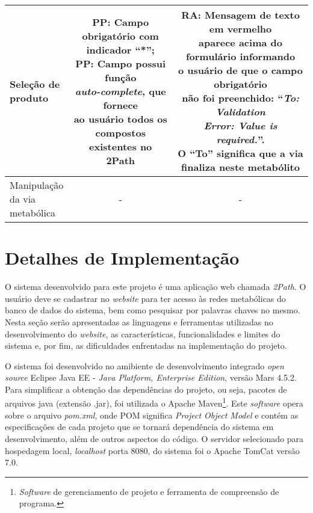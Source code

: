 \begin{table}
\begin{tabular}{|l|c|c|}
\specialcell{Seleção de\\produto} & \specialcell{\textbf{PP}: Campo obrigatório com\\indicador ``*'';\\\textbf{PP}: Campo possui função\\\textit{auto-complete}, que fornece\\ao usuário todos os\\compostos existentes no\\2Path} & \specialcell{\textbf{RA}: Mensagem de texto em vermelho \\aparece acima do formulário informando\\o usuário de que o campo obrigatório\\não foi preenchido: ``\textit{To: Validation}\\\textit{Error: Value is required.}''.\\O ``To'' significa que a via\\finaliza neste metabólito} \\ \hline

\specialcell{Manipulação\\da via\\metabólica} & - & - \\ \hline
\end{tabular}
\end{table}


\section{Detalhes de Implementação}


\indent O sistema desenvolvido para este projeto é uma aplicação web chamada \textit{2Path}. O usuário deve se cadastrar no \textit{website} para ter acesso às redes metabólicas do banco de dados do sistema, bem como pesquisar por palavras chaves no mesmo. Nesta seção serão apresentadas as linguagens e ferramentas utilizadas no desenvolvimento do \textit{website}, as características, funcionalidades e limites do sistema e, por fim, as dificuldades enfrentadas na implementação do projeto.

\indent O sistema foi desenvolvido no amibiente de desenvolvimento integrado \textit{open source} Eclipse Java EE - \textit{Java Platform, Enterprise Edition}, versão Mars 4.5.2. Para simplificar a obtenção das dependências do projeto, ou seja, pacotes de arquivos java (extensão .jar), foi utilizada o Apache Maven\footnote{\textit{Software} de gerenciamento de projeto e ferramenta de compreensão de programa.}. Este \textit{software} opera sobre o arquivo \textit{pom.xml}, onde POM significa \textit{Project Object Model} e contém as especificações de cada projeto que se tornará dependência do sistema em desenvolvimento, além de outros aspectos do código. O servidor selecionado para hospedagem local, \textit{localhost} porta 8080, do sistema foi o Apache TomCat versão 7.0.

